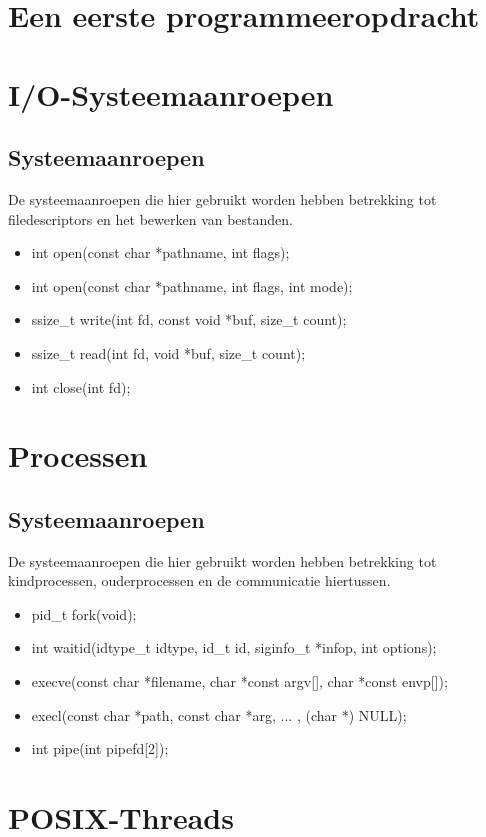 \documentclass{report}
\begin{document}
\chapter{Een eerste programmeeropdracht}




\chapter{I/O-Systeemaanroepen}
\section{Systeemaanroepen}
De systeemaanroepen die hier gebruikt worden hebben betrekking tot filedescriptors en het bewerken van bestanden.
\begin{itemize}
	\item int open(const char *pathname, int flags);
	\item int open(const char *pathname, int flags, int mode);
	\item ssize\_t write(int fd, const void *buf, size\_t count);
	\item ssize\_t read(int fd, void *buf, size\_t count);
	\item int close(int fd);
\end{itemize}

\chapter{Processen}
\section{Systeemaanroepen}
De systeemaanroepen die hier gebruikt worden hebben betrekking tot kindprocessen, ouderprocessen en de communicatie hiertussen.
\begin{itemize}
	\item pid\_t fork(void);
	\item int waitid(idtype\_t idtype, id\_t id, siginfo\_t *infop, int options);
	\item execve(const char *filename, char *const argv[], char *const envp[]);
	\item execl(const char *path, const char *arg, ... , (char *) NULL);
	\item int pipe(int pipefd[2]);
\end{itemize}

\chapter{POSIX-Threads}
\end{document}
